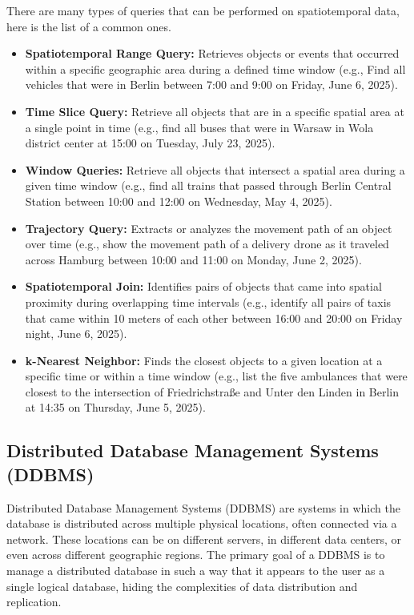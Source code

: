 There are many types of queries that can be performed on spatiotemporal data, here is the list of a common ones.
\begin{itemize}
  \item \textbf{Spatiotemporal Range Query:} Retrieves objects or events that occurred within a specific geographic area during a defined time window
    (e.g., Find all vehicles that were in Berlin between 7:00 and 9:00 on Friday, June 6, 2025).

  \item \textbf{Time Slice Query:} Retrieve all objects that are in a specific spatial area at a single point in time
    (e.g., find all buses that were in Warsaw in Wola district center at 15:00 on Tuesday, July 23, 2025).

  \item \textbf{Window Queries:} Retrieve all objects that intersect a spatial area during a given time window
    (e.g., find all trains that passed through Berlin Central Station between 10:00 and 12:00 on Wednesday, May 4, 2025).

  \item \textbf{Trajectory Query:} Extracts or analyzes the movement path of an object over time
    (e.g., show the movement path of a delivery drone as it traveled across Hamburg between 10:00 and 11:00 on Monday, June 2, 2025).

  \item \textbf{Spatiotemporal Join:} Identifies pairs of objects that came into spatial proximity during overlapping time intervals
    (e.g., identify all pairs of taxis that came within 10 meters of each other between 16:00 and 20:00 on Friday night, June 6, 2025).

  \item \textbf{k-Nearest Neighbor:} Finds the closest objects to a given location at a specific time or within a time window
    (e.g., list the five ambulances that were closest to the intersection of Friedrichstraße and Unter den Linden in Berlin at 14:35 on Thursday, June 5, 2025).
\end{itemize}

\subsection{Distributed Database Management Systems (DDBMS)}
Distributed Database Management Systems (DDBMS) are systems in which the database is distributed across multiple physical locations, often connected via a network.
These locations can be on different servers, in different data centers, or even across different geographic regions.
The primary goal of a DDBMS is to manage a distributed database in such a way that it appears to the user as a single logical database, hiding the complexities of data distribution and replication.
\cite{ozsuDistributedParallelDatabase1996}

